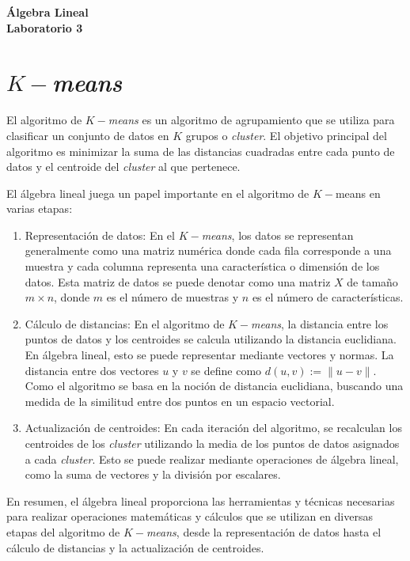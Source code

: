 \documentclass[12pt]{article}
\theoremstyle{exampstyle}
\theoremstyle{definition}
\theoremstyle{break}
\numberwithin{equation}{section}
\begin{document}
\begin{minipage}[r]{15cm}


\end{minipage}

\begin{center}
\Large{\textbf{\'Algebra Lineal\\Laboratorio 3  }}
\end{center}
\section*{$K-$\emph{means}}
El algoritmo de $K-$\emph{means} es un algoritmo de agrupamiento que se utiliza para clasificar un conjunto de datos en $K$ grupos o \emph{cluster}. El objetivo principal del algoritmo es minimizar la suma de las distancias cuadradas entre cada punto de datos y el centroide del \emph{cluster} al que pertenece.

El álgebra lineal juega un papel importante en el algoritmo de $K-$means en varias etapas:

\begin{enumerate}
    \item Representación de datos: En el $K-$\emph{means}, los datos se representan generalmente como una matriz numérica donde cada fila corresponde a una muestra y cada columna representa una característica o dimensión de los datos. Esta matriz de datos se puede denotar como una matriz $X$ de tamaño $m \times n$, donde $m$ es el número de muestras y $n$ es el número de características.
    \item Cálculo de distancias: En el algoritmo de $K-$\emph{means}, la distancia entre los puntos de datos y los centroides se calcula utilizando la distancia euclidiana. En álgebra lineal, esto se puede representar mediante vectores y normas. La distancia entre dos vectores $u$ y $v$ se define como $d(u,v):=\|u-v\|.$
    Como el algoritmo se basa en la noción de distancia euclidiana, buscando una medida de la similitud entre dos puntos en un espacio vectorial.
    \item Actualización de centroides: En cada iteración del algoritmo, se recalculan los centroides de los \emph{cluster} utilizando la media de los puntos de datos asignados a cada \emph{cluster}. Esto se puede realizar mediante operaciones de álgebra lineal, como la suma de vectores y la división por escalares.


\end{enumerate}


En resumen, el álgebra lineal proporciona las herramientas y técnicas necesarias para realizar operaciones matemáticas y cálculos que se utilizan en diversas etapas del algoritmo de $K-$\emph{means}, desde la representación de datos hasta el cálculo de distancias y la actualización de centroides.
\end{document}
